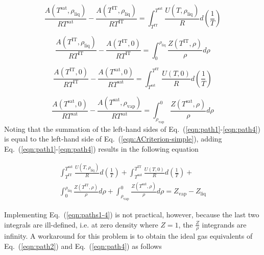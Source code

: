\documentclass[5p,times]{elsarticle}
\begin{document}
\begin{equation}
\frac{A(T^\mathrm{sat},\rho_\mathrm{liq})}{RT^\mathrm{sat}}
-
\frac{A(T^\mathrm{IT},\rho_\mathrm{liq})}{RT^\mathrm{IT}}
=
\int _{T^\mathrm{IT}}^{T^\mathrm{sat}} \frac{U(T,\rho_\mathrm{liq})}{R}  d\left(\frac{1}{T}\right)
\label{eqn:path1}
\end{equation}

\begin{equation}
\frac{A(T^\mathrm{IT},\rho_\mathrm{liq})}{RT^\mathrm{IT}}
-
\frac{A(T^\mathrm{IT},0)}{RT^\mathrm{IT}}
=
\int _{0}^{\rho_\mathrm{liq}} \frac{Z(T^\mathrm{IT},\rho)}{\rho}  d\rho
\label{eqn:path2}
\end{equation}

\begin{equation}
\frac{A(T^\mathrm{IT},0)}{RT^\mathrm{IT}}
-
\frac{A(T^\mathrm{sat},0)}{RT^\mathrm{sat}}
=
\int _{T^\mathrm{sat}}^{T^\mathrm{IT}} \frac{U(T,0)}{R}  d\left(\frac{1}{T}\right)
\label{eqn:path3}
\end{equation}

\begin{equation}
\frac{A(T^\mathrm{sat},0)}{RT^\mathrm{sat}}
-
\frac{A(T^\mathrm{sat},\rho_\mathrm{vap})}{RT^\mathrm{sat}}
=
\int _{\rho_\mathrm{vap}}^{0} \frac{Z(T^\mathrm{sat},\rho)}{\rho}  d\rho
\label{eqn:path4}
\end{equation}
Noting that the summation of the left-hand sides of Eq.~(\ref{eqn:path1}-\ref{eqn:path4}) is equal to the left-hand side of Eq.~(\ref{eqn:ACriterion-simple}), adding Eq.~(\ref{eqn:path1}-\ref{eqn:path4}) results in the following equation

\begin{equation}
\begin{array}{l}
\int _{T^\mathrm{IT}}^{T^\mathrm{sat}} \frac{U(T,\rho_\mathrm{liq})}{R}  d\left(\frac{1}{T}\right)+
\int _{T^\mathrm{sat}}^{T^\mathrm{IT}} \frac{U(T,0)}{R}  d\left(\frac{1}{T}\right)+
\\
\int _{0}^{\rho_\mathrm{liq}} \frac{Z(T^\mathrm{IT},\rho)}{\rho}  d\rho + \int _{\rho_\mathrm{vap}}^{0} \frac{Z(T^\mathrm{sat},\rho)}{\rho}  d\rho=Z_\mathrm{vap} - Z_\mathrm{liq} 
\end{array}
\label{eqn:paths1-4}
\end{equation}

Implementing Eq.~(\ref{eqn:paths1-4}) is not practical, however, because the last two integrals are ill-defined, i.e. at zero density where $Z=1$, the $\frac{Z}{\rho}$ integrands are infinity. A workaround for this problem is to obtain the ideal gas equivalents of Eq.~(\ref{eqn:path2}) and Eq.~(\ref{eqn:path4}) as follows
\end{document}
